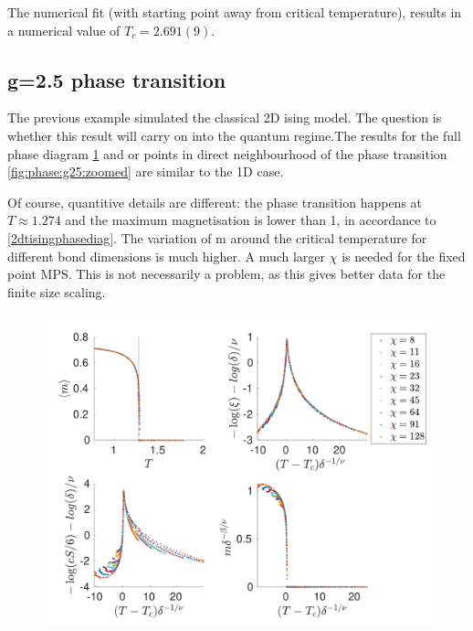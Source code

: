 The numerical fit (with starting point away from  critical temperature), results in a numerical value of $T_c = 2.691(9) $.

\subsection{g=2.5 phase transition }

The previous example simulated the classical 2D ising model. The question is whether this result will carry on into the quantum regime.The results for the full phase diagram \cref{fig:phase:g25:full} and or points in direct neighbourhood of the phase transition \cref{fig:phase:g25:zoomed} are similar to the 1D case.

Of course, quantitive details are different: the phase transition happens at $T\approx 1.274$ and the maximum magnetisation is lower than 1, in accordance to \cref{2dtisingphasediag}. The variation of m around the critical temperature for different bond dimensions is much higher. A much larger $\chi$ is needed for the fixed point MPS. This is not necessarily a problem, as this gives better data for the finite size scaling.

\begin{figure}
    \center
    \includegraphics[width=\textwidth]{Figuren/phasediag/g25/Full.pdf}
    \caption{  }
    \label{fig:phase:g25:full}
\end{figure}


